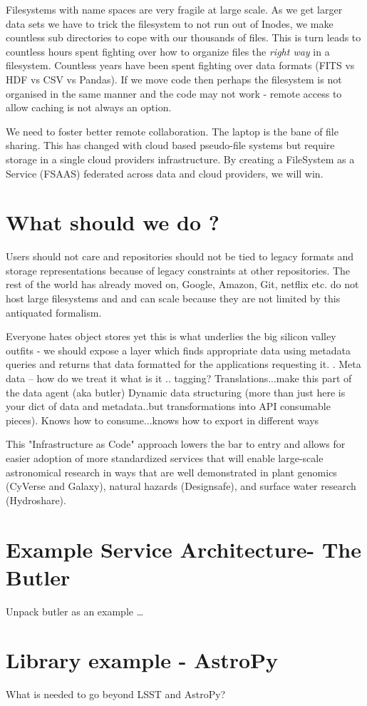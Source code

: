 Filesystems with name spaces are very fragile at large scale. As we get larger data sets we have to trick the filesystem to not run out of Inodes, we make countless sub directories to cope with our thousands of files.
This is turn leads to countless hours spent fighting over how to organize files  the \emph{right way} in a filesystem.
Countless years have been spent fighting over data formats (FITS vs HDF vs CSV vs Pandas).
If we move code then perhaps the filesystem is not organised in the same manner and the code may not work - remote access to allow caching is not always an option.

We need to foster better remote collaboration.  The laptop is the bane of file sharing.
This has changed with cloud based pseudo-file systems but require storage in a single 
cloud providers infrastructure. By creating a FileSystem as a Service (FSAAS) federated
across data and cloud providers, we will win.


\section{What should  we do ?}
Users should not care and repositories should not be tied to legacy formats  and storage representations because of legacy constraints  at other repositories.
The rest of the world has already moved on,  Google, Amazon, Git, netflix etc. do not host large filesystems and and can scale because they are not limited by this antiquated formalism.

Everyone hates object stores  yet this is what underlies the big silicon valley outfits - we should expose a layer which finds appropriate data using metadata queries and returns that data formatted for the applications requesting it.
.
Meta data -- how do we treat it what is it ..  tagging?  Translations...make this part of the data agent (aka butler)
Dynamic data structuring (more than just here is your dict of data and metadata..but transformations into API consumable pieces).  Knows how to consume...knows how to export in different ways

This "Infrastructure as Code" \citep{morris2016infrastructure} approach lowers the bar to entry
and allows for easier adoption of more standardized services that will enable large-scale
astronomical research in ways that are well demonstrated in plant genomics (CyVerse and Galaxy), natural hazards (Designsafe), and surface water research (Hydroshare).


\section{Example Service Architecture- The Butler}
Unpack butler as an example …

\section{Library example - AstroPy}
What is needed to go beyond LSST and AstroPy?


